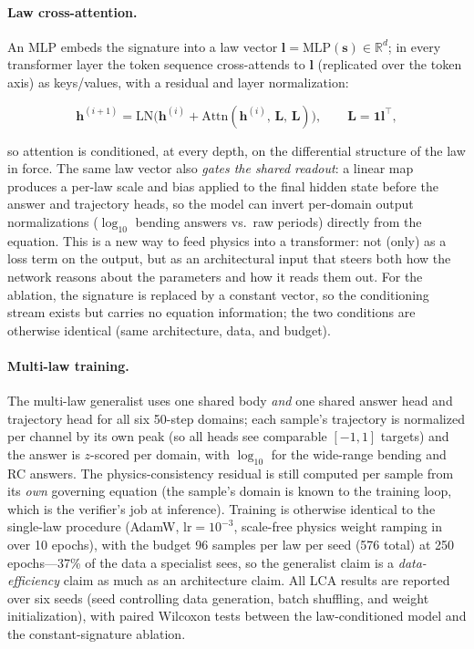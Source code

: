 \documentclass[11pt,a4paper]{article}
\begin{document}
\paragraph{Law cross-attention.} An MLP embeds the signature into a law
vector $\mathbf{l}=\mathrm{MLP}(\mathbf{s})\in\mathbb{R}^{d}$; in every
transformer layer the token sequence cross-attends to $\mathbf{l}$
(replicated over the token axis) as keys/values, with a residual and layer
normalization:

\[
\mathbf{h}^{(i+1)} = \mathrm{LN}\big(\mathbf{h}^{(i)} + \mathrm{Attn}(\mathbf{h}^{(i)},\,\mathbf{L},\,\mathbf{L})\big),
\qquad \mathbf{L}=\mathbf{1}\mathbf{l}^{\top},
\]

so attention is conditioned, at every depth, on the differential structure
of the law in force. The same law vector also \emph{gates the shared
readout}: a linear map produces a per-law scale and bias applied to the
final hidden state before the answer and trajectory heads, so the model can
invert per-domain output normalizations ($\log_{10}$ bending answers vs.\
raw periods) directly from the equation. This is a new way to feed physics
into a transformer: not (only) as a loss term on the output, but as an
architectural input that steers both how the network reasons about the
parameters and how it reads them out. For the ablation, the
signature is replaced by a constant vector, so the conditioning stream
exists but carries no equation information; the two conditions are
otherwise identical (same architecture, data, and budget).

\paragraph{Multi-law training.} The multi-law generalist uses one shared
body \emph{and} one shared answer head and trajectory head for all six
50-step domains; each sample's trajectory is normalized per channel by its
own peak (so all heads see comparable $[-1,1]$ targets) and the answer is
$z$-scored per domain, with $\log_{10}$ for the wide-range bending and RC
answers. The physics-consistency residual is still computed per sample from
its \emph{own} governing equation (the sample's domain is known to the
training loop, which is the verifier's job at inference). Training is
otherwise identical to the single-law procedure (AdamW, $\mathrm{lr}=10^{-3}$,
scale-free physics weight ramping in over 10 epochs), with the budget 96
samples per law per seed (576 total) at 250 epochs---37\% of the data a
specialist sees, so the generalist claim is a \emph{data-efficiency} claim
as much as an architecture claim. All LCA results are reported over six
seeds (seed controlling data generation, batch shuffling, and weight
initialization), with paired Wilcoxon tests between the law-conditioned
model and the constant-signature ablation.
\end{document}
